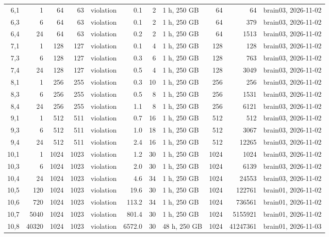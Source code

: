 \documentclass[10pt]{article}
\begin{document}
\begin{longtable}{@{}rrrrlrrlrrl@{}}
\color{blue} 6,1 & 1 & 64 & 63 & violation & 0.1 & 2 & 1 h, 250 GB & 64 & 64 & brain03, 2026-11-02 \\
\color{blue} 6,3 & 6 & 64 & 63 & violation & 0.1 & 2 & 1 h, 250 GB & 64 & 379 & brain03, 2026-11-02 \\
\color{blue} 6,4 & 24 & 64 & 63 & violation & 0.2 & 2 & 1 h, 250 GB & 64 & 1513 & brain03, 2026-11-02 \\
\color{blue} 7,1 & 1 & 128 & 127 & violation & 0.1 & 4 & 1 h, 250 GB & 128 & 128 & brain03, 2026-11-02 \\
\color{blue} 7,3 & 6 & 128 & 127 & violation & 0.3 & 6 & 1 h, 250 GB & 128 & 763 & brain03, 2026-11-02 \\
\color{blue} 7,4 & 24 & 128 & 127 & violation & 0.5 & 4 & 1 h, 250 GB & 128 & 3049 & brain03, 2026-11-02 \\
\color{blue} 8,1 & 1 & 256 & 255 & violation & 0.3 & 10 & 1 h, 250 GB & 256 & 256 & brain03, 2026-11-02 \\
\color{blue} 8,3 & 6 & 256 & 255 & violation & 0.5 & 8 & 1 h, 250 GB & 256 & 1531 & brain03, 2026-11-02 \\
\color{blue} 8,4 & 24 & 256 & 255 & violation & 1.1 & 8 & 1 h, 250 GB & 256 & 6121 & brain03, 2026-11-02 \\
\color{blue} 9,1 & 1 & 512 & 511 & violation & 0.7 & 16 & 1 h, 250 GB & 512 & 512 & brain03, 2026-11-02 \\
\color{blue} 9,3 & 6 & 512 & 511 & violation & 1.0 & 18 & 1 h, 250 GB & 512 & 3067 & brain03, 2026-11-02 \\
\color{blue} 9,4 & 24 & 512 & 511 & violation & 2.4 & 16 & 1 h, 250 GB & 512 & 12265 & brain03, 2026-11-02 \\
\color{blue} 10,1 & 1 & 1024 & 1023 & violation & 1.2 & 30 & 1 h, 250 GB & 1024 & 1024 & brain03, 2026-11-02 \\
\color{blue} 10,3 & 6 & 1024 & 1023 & violation & 2.0 & 30 & 1 h, 250 GB & 1024 & 6139 & brain03, 2026-11-02 \\
\color{blue} 10,4 & 24 & 1024 & 1023 & violation & 4.6 & 34 & 1 h, 250 GB & 1024 & 24553 & brain03, 2026-11-02 \\
\color{blue} 10,5 & 120 & 1024 & 1023 & violation & 19.6 & 30 & 1 h, 250 GB & 1024 & 122761 & brain01, 2026-11-02 \\
\color{blue} 10,6 & 720 & 1024 & 1023 & violation & 113.2 & 34 & 1 h, 250 GB & 1024 & 736561 & brain01, 2026-11-02 \\
\color{blue} 10,7 & 5040 & 1024 & 1023 & violation & 801.4 & 30 & 1 h, 250 GB & 1024 & 5155921 & brain01, 2026-11-02 \\
\color{blue} 10,8 & 40320 & 1024 & 1023 & violation & 6572.0 & 30 & 48 h, 250 GB & 1024 & 41247361 & brain01, 2026-11-03 \\
\bottomrule
\end{longtable}
\end{document}
